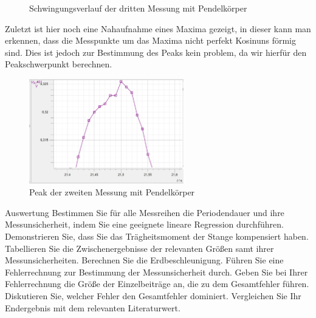 \documentclass[twoside]{protokoll}
\begin{document}
\begin{figure}[H]
    \centering
    \hfill
    \caption{Schwingungsverlauf der dritten Messung mit Pendelkörper}
    \end{figure}

Zuletzt ist hier noch eine Nahaufnahme eines Maxima gezeigt, in dieser kann man erkennen, dass die Messpunkte um das Maxima nicht perfekt Kosinuns förmig sind.
Dies ist jedoch zur Bestimmung des Peaks kein problem, da wir hierfür den Peakschwerpunkt berechnen.

\begin{figure}[H]
    \centering
    \includegraphics[width=0.6\textwidth]{plots/gewicht-2-peak.pdf}
    \caption{Peak der zweiten Messung mit Pendelkörper}
    \end{figure}
     
     
\begin{aufgabe}{Auswertung}
  Bestimmen Sie für alle Messreihen die Periodendauer und ihre
  Messunsicherheit, indem Sie eine geeignete lineare Regression
  durchführen. Demonstrieren Sie, dass Sie das Trägheitsmoment der
  Stange kompensiert haben. Tabellieren Sie die Zwischenergebnisse
  der relevanten Größen samt ihrer Messunsicherheiten. Berechnen
  Sie die Erdbeschleunigung. Führen Sie eine Fehlerrechnung zur
  Bestimmung der Messunsicherheit durch. Geben Sie bei Ihrer
  Fehlerrechnung die Größe der Einzelbeiträge an, die zu dem
  Gesamtfehler führen. Diskutieren Sie, welcher Fehler den
  Gesamtfehler dominiert. Vergleichen Sie Ihr Endergebnis mit dem
  relevanten Literaturwert.
\end{aufgabe}
\end{document}
